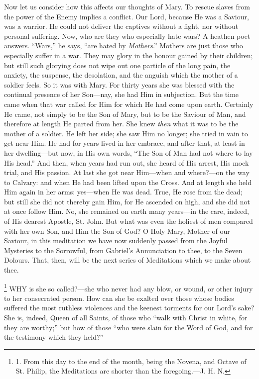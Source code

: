 Now let us consider how this
affects our thoughts of Mary. To rescue slaves from the power of the
Enemy implies a conflict. Our Lord, because He was a Saviour, was a
warrior. He could not deliver the captives without a fight, nor without
personal suffering. Now, who are they who especially hate wars? A
heathen poet answers. ``Wars,'' he says, ``are hated by \emph{Mothers}.''
Mothers are just those who especially suffer in a war. They may glory in
the honour gained by their children; but still such glorying does not
wipe out one particle of the long pain, the anxiety, the suspense, the
desolation, and the anguish which the mother of a soldier feels. So it
was with Mary. For thirty years she was blessed with the continual
presence of her Son—nay, she had Him in subjection. But the time came
when that war called for Him for which He had come upon earth. Certainly
He came, not simply to be the Son of Mary, but to be the Saviour of Man,
and therefore at length He parted from her. She knew \emph{then}
what it was to be the mother of a soldier. He left her side; she saw Him
no longer; she tried in vain to get near Him. He had for years lived in
her embrace, and after that, at least in her dwelling—but now, in His
own words, ``The Son of Man had not where to lay His head.'' And then,
when years had run out, she heard of His arrest, His mock trial, and His
passion. At last she got near Him—when and where?—on the way to
Calvary: and when He had been lifted upon the Cross. And at length she
held Him again in her arms: yes—when He was dead. True, He rose from
the dead; but still she did not thereby gain Him, for He ascended on
high, and she did not at once follow Him. No, she remained on earth many
years—in the care, indeed, of His dearest Apostle, St. John. But what
was even the holiest of men compared with her own Son, and Him the Son
of God? O Holy Mary, Mother of our Saviour, in this meditation we have
now suddenly passed from the Joyful Mysteries to the Sorrowful, from
Gabriel's Annunciation to thee, to the Seven Dolours. That, then, will
be the next series of Meditations which we make about thee.



\footnote{

1. From this day to the end of
the month, being the Novena, and Octave of St. Philip, the Meditations
are shorter than the foregoing.—J. H. N.} WHY
is she so called?—she who never had any blow, or wound, or other
injury to her consecrated person. How can she be exalted over those
whose bodies suffered the most ruthless violences and the keenest
torments for our Lord's sake? She is, indeed, Queen of all Saints, of
those who ``walk with Christ in white, for they are worthy;'' but how of
those ``who were slain for the Word of God, and for the testimony which
they held?''

